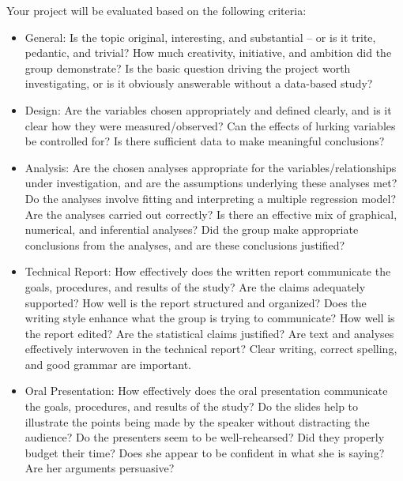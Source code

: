 \documentclass[]{article}
\begin{document}
Your project will be evaluated based on the following criteria:

\begin{itemize}
\item
  General: Is the topic original, interesting, and substantial -- or is
  it trite, pedantic, and trivial? How much creativity, initiative, and
  ambition did the group demonstrate? Is the basic question driving the
  project worth investigating, or is it obviously answerable without a
  data-based study?
\item
  Design: Are the variables chosen appropriately and defined clearly,
  and is it clear how they were measured/observed? Can the effects of
  lurking variables be controlled for? Is there sufficient data to make
  meaningful conclusions?
\item
  Analysis: Are the chosen analyses appropriate for the
  variables/relationships under investigation, and are the assumptions
  underlying these analyses met? Do the analyses involve fitting and
  interpreting a multiple regression model? Are the analyses carried out
  correctly? Is there an effective mix of graphical, numerical, and
  inferential analyses? Did the group make appropriate conclusions from
  the analyses, and are these conclusions justified?
\item
  Technical Report: How effectively does the written report communicate
  the goals, procedures, and results of the study? Are the claims
  adequately supported? How well is the report structured and organized?
  Does the writing style enhance what the group is trying to
  communicate? How well is the report edited? Are the statistical claims
  justified? Are text and analyses effectively interwoven in the
  technical report? Clear writing, correct spelling, and good grammar
  are important.
\item
  Oral Presentation: How effectively does the oral presentation
  communicate the goals, procedures, and results of the study? Do the
  slides help to illustrate the points being made by the speaker without
  distracting the audience? Do the presenters seem to be well-rehearsed?
  Did they properly budget their time? Does she appear to be confident
  in what she is saying? Are her arguments persuasive?
\end{itemize}
\end{document}
